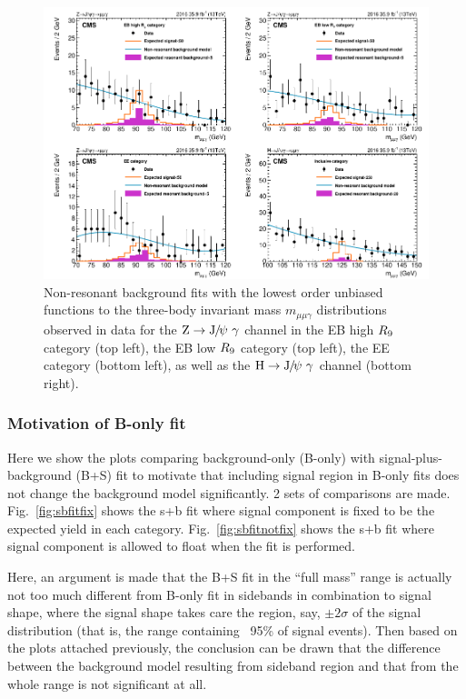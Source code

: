 		\begin{figure}[p]
		    \centering
		    \includegraphics[width=1.0\textwidth]{Fig/Fit/CMS-SMP-17-012_Figure_007}
		    \caption{\label{fig:finalfit}
		     Non-resonant background fits with the lowest order unbiased functions to the three-body invariant mass $m_{\mu\mu\gamma}$ distributions observed in data for the $\mathrm{Z}\to{\mathrm{J}\hspace{-.08em}/\hspace{-.14em}\psi}\ \gamma$ channel in the EB high $R_\mathrm{9}$ category (top left), the EB low $R_\mathrm{9}$ category (top left), the EE category (bottom left), as well as the $\mathrm{H}\to{\mathrm{J}\hspace{-.08em}/\hspace{-.14em}\psi}\ \gamma$ channel (bottom right).}
		\end{figure}

\clearpage		
		
		\subsubsection*{Motivation of B-only fit}
		Here we show the plots comparing background-only (B-only) with signal-plus-background (B+S) fit to motivate that including signal region in B-only fits does not change the background model significantly. 2 sets of comparisons are made. 
		Fig.~\ref{fig:sbfitfix} shows the s+b fit where signal component is fixed to be the expected yield in each category. 
		Fig.~\ref{fig:sbfitnotfix} shows the s+b fit where signal component is allowed to float when the fit is performed.
		
		Here, an argument is made that the B+S fit in the ``full mass'' range is actually not too much different from B-only fit in sidebands in combination to signal shape, where the signal shape takes care the region, say, $\pm 2\sigma$ of the signal distribution (that is, the range containing ~95\% of signal events). Then based on the plots attached previously, the conclusion can be drawn that the difference between the background model resulting from sideband region and that from the whole range is not significant at all.
		

